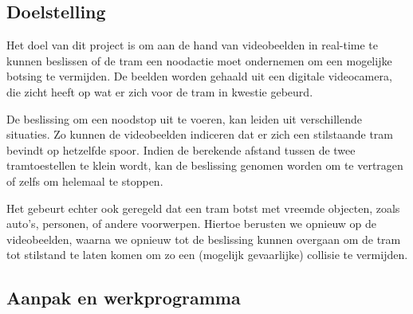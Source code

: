 \documentclass[a4paper,oneside,11pt,final]{memoir}
\begin{document}
\subsection{Doelstelling}\label{sec:Doelstelling}


Het doel van dit project is om aan de hand van videobeelden in real-time te kunnen beslissen of de tram een noodactie moet ondernemen om een mogelijke botsing te vermijden. De beelden worden gehaald uit een digitale videocamera, die zicht heeft op wat er zich voor de tram in kwestie gebeurd.

De beslissing om een noodstop uit te voeren, kan leiden uit verschillende situaties. Zo kunnen de videobeelden indiceren dat er zich een stilstaande tram bevindt op hetzelfde spoor. Indien de berekende afstand tussen de twee tramtoestellen te klein wordt, kan de beslissing genomen worden om te vertragen of zelfs om helemaal te stoppen.

Het gebeurt echter ook geregeld dat een tram botst met vreemde objecten, zoals auto's, personen, of andere voorwerpen. Hiertoe berusten we opnieuw op de videobeelden, waarna we opnieuw tot de beslissing kunnen overgaan om de tram tot stilstand te laten komen om zo een (mogelijk gevaarlijke) collisie te vermijden.


\subsection{Aanpak en werkprogramma}\label{sec:Aanpak}

\end{document}
